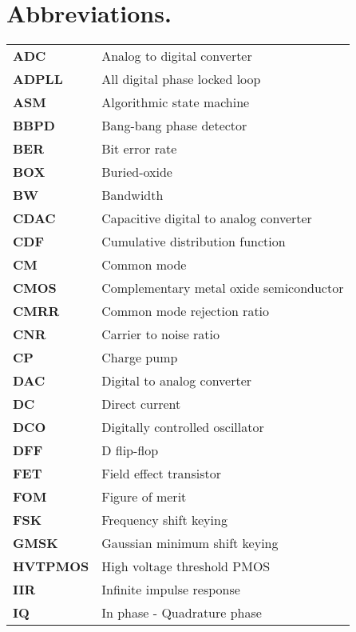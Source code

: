 \section*{Abbreviations.}
	{\renewcommand*{\arraystretch}{1.00}\large
	\begin{tabular}{@{}ll}
		\textbf{\textsf{ADC}}	&	Analog to digital converter \\
		\textbf{\textsf{ADPLL}}	&	All digital phase locked loop \\
		\textbf{\textsf{ASM}}	&	Algorithmic state machine \\
		\textbf{\textsf{BBPD}}	&	Bang-bang phase detector \\
		\textbf{\textsf{BER}}	&	Bit error rate \\
		\textbf{\textsf{BOX}}	&	Buried-oxide \\
		\textbf{\textsf{BW}}	&	Bandwidth \\
		\textbf{\textsf{CDAC}}	&	Capacitive digital to analog converter \\
		\textbf{\textsf{CDF}}	&	Cumulative distribution function \\
		\textbf{\textsf{CM}}	&	Common mode \\
		\textbf{\textsf{CMOS}}	&	Complementary metal oxide semiconductor \\
		\textbf{\textsf{CMRR}}	&	Common mode rejection ratio \\
		\textbf{\textsf{CNR}}	&	Carrier to noise ratio \\
		\textbf{\textsf{CP}}	&	Charge pump \\
		\textbf{\textsf{DAC}}	&	Digital to analog converter \\
		\textbf{\textsf{DC}}	&	Direct current \\
		\textbf{\textsf{DCO}}	&	Digitally controlled oscillator \\
		\textbf{\textsf{DFF}}	&	D flip-flop \\
		\textbf{\textsf{FET}}	&	Field effect transistor \\
		\textbf{\textsf{FOM}}	&	Figure of merit \\
		\textbf{\textsf{FSK}}	&	Frequency shift keying \\
		\textbf{\textsf{GMSK}}	&	Gaussian minimum shift keying \\
		\textbf{\textsf{HVTPMOS}}	&	High voltage threshold PMOS \\
		\textbf{\textsf{IIR}}	&	Infinite impulse response \\
		\textbf{\textsf{IQ}}	&	In phase - Quadrature phase \\

\end{tabular}}
